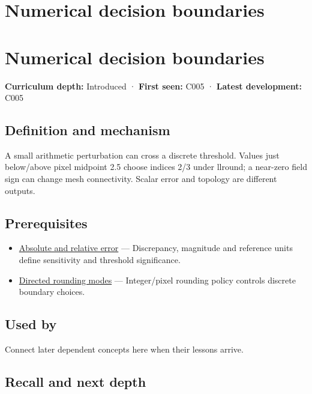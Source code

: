 \hypertarget{appendix-c80db39080be}{}
\section*{Numerical decision boundaries}
\section{Numerical decision boundaries}\label{appendix-c80db39080be-numerical-decision-boundaries}

\textbf{Curriculum depth:} Introduced · \textbf{First seen:} C005 · \textbf{Latest development:} C005

\subsection{Definition and mechanism}\label{appendix-c80db39080be-definition-and-mechanism}

A small arithmetic perturbation can cross a discrete threshold. Values just below/above pixel midpoint 2.5 choose indices 2/3 under llround; a near-zero field sign can change mesh connectivity. Scalar error and topology are different outputs.

\subsection{Prerequisites}\label{appendix-c80db39080be-prerequisites}

\begin{itemize}
\tightlist
\item
  \hyperref[appendix-3ae74e89b4e6]{Absolute and relative error} --- Discrepancy, magnitude and reference units define sensitivity and threshold significance.
\item
  \hyperref[appendix-637d164ae5ca]{Directed rounding modes} --- Integer/pixel rounding policy controls discrete boundary choices.
\end{itemize}

\subsection{Used by}\label{appendix-c80db39080be-used-by}

Connect later dependent concepts here when their lessons arrive.

\subsection{Recall and next depth}\label{appendix-c80db39080be-recall-and-next-depth}

